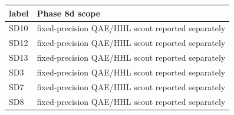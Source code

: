 \begin{tabular}{ll}
\hline
label & Phase 8d scope \\
\hline
SD10 & fixed-precision QAE/HHL scout reported separately \\
SD12 & fixed-precision QAE/HHL scout reported separately \\
SD13 & fixed-precision QAE/HHL scout reported separately \\
SD3 & fixed-precision QAE/HHL scout reported separately \\
SD7 & fixed-precision QAE/HHL scout reported separately \\
SD8 & fixed-precision QAE/HHL scout reported separately \\
\hline
\end{tabular}
